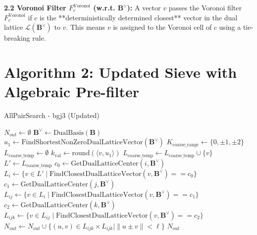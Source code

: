\documentclass{article}
\begin{document}
\textbf{2.2 Voronoi Filter $F_{c}^{\text{Voronoi}}$ (w.r.t. $\mathbf{B}^{\vee}$):} A vector $v$ passes the Voronoi filter $F_{c}^{\text{Voronoi}}$ if $c$ is the **deterministically determined closest** vector in the dual lattice $\mathcal{L}(\mathbf{B}^{\vee})$ to $v$. This means $v$ is assigned to the Voronoi cell of $c$ using a tie-breaking rule.
\clearpage 

\section{Algorithm 2: Updated Sieve with Algebraic Pre-filter}

\begin{algorithm}[H]
\caption{AllPairSearch - bgj3 (Updated)} \label{alg:all_pair_search_updated}
\begin{algorithmic}[1]
\State $N_{out} \gets \emptyset$
\State $\mathbf{B}^{\vee} \gets \text{DualBasis}(\mathbf{B})$ 
\State $u_1 \gets \text{FindShortestNonZeroDualLatticeVector}(\mathbf{B}^{\vee})$ 
\State $K_{\text{coarse\_range}} \gets \{0, \pm 1, \pm 2\}$
\State $L_{\text{coarse\_temp}} \gets \emptyset$
    \State $k_{\text{val}} \gets \text{round}(\langle v, u_1 \rangle)$
        \State $L_{\text{coarse\_temp}} \gets L_{\text{coarse\_temp}} \cup \{v\}$
    \EndIf
\EndFor
\State $L' \gets L_{\text{coarse\_temp}}$ 
\State
{}
    \State $c_0 \gets \text{GetDualLatticeCenter}(i, \mathbf{B}^{\vee})$
    \State $L_i \gets \{ v \in L' \mid \text{FindClosestDualLatticeVector}(v, \mathbf{B}^{\vee}) == c_0 \}$
        \State $c_1 \gets \text{GetDualLatticeCenter}(j, \mathbf{B}^{\vee})$
        \State $L_{ij} \gets \{ v \in L_i \mid \text{FindClosestDualLatticeVector}(v, \mathbf{B}^{\vee}) == c_1 \}$
            \State $c_2 \gets \text{GetDualLatticeCenter}(k, \mathbf{B}^{\vee})$
            \State $L_{ijk} \gets \{ v \in L_{ij} \mid \text{FindClosestDualLatticeVector}(v, \mathbf{B}^{\vee}) == c_2 \}$
            \State $N_{out} \gets N_{out} \cup \{ (u, v) \in L_{ijk} \times L_{ijk} \mid \|u \pm v\| < \ell \}$
        \EndFor
    \EndFor
\EndFor
\State \Return $N_{out}$
\end{algorithmic}
\end{algorithm}
\end{document}
